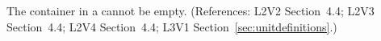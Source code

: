 The  container in a \UnitDefinition cannot be
empty.  (References: L2V2 Section~4.4; L2V3 Section~4.4; L2V4 Section~4.4; 
L3V1 Section~\ref{sec:unitdefinitions}.)
